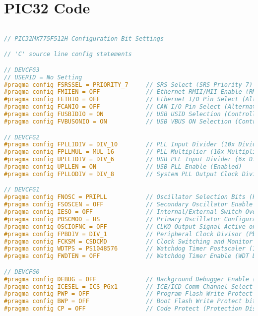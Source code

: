 \chapter{PIC32 Code}\label{appendix:pic32_code}

\begin{lstlisting}[language=C]

// PIC32MX775F512H Configuration Bit Settings

// 'C' source line config statements

// DEVCFG3
// USERID = No Setting
#pragma config FSRSSEL = PRIORITY_7     // SRS Select (SRS Priority 7)
#pragma config FMIIEN = OFF             // Ethernet RMII/MII Enable (RMII Enabled)
#pragma config FETHIO = OFF             // Ethernet I/O Pin Select (Alternate Ethernet I/O)
#pragma config FCANIO = OFF             // CAN I/O Pin Select (Alternate CAN I/O)
#pragma config FUSBIDIO = ON            // USB USID Selection (Controlled by the USB Module)
#pragma config FVBUSONIO = ON           // USB VBUS ON Selection (Controlled by USB Module)

// DEVCFG2
#pragma config FPLLIDIV = DIV_10        // PLL Input Divider (10x Divider)
#pragma config FPLLMUL = MUL_16         // PLL Multiplier (16x Multiplier)
#pragma config UPLLIDIV = DIV_6         // USB PLL Input Divider (6x Divider)
#pragma config UPLLEN = ON              // USB PLL Enable (Enabled)
#pragma config FPLLODIV = DIV_8         // System PLL Output Clock Divider (PLL Divide by 8)

// DEVCFG1
#pragma config FNOSC = PRIPLL           // Oscillator Selection Bits (Primary Osc w/PLL (XT+,HS+,EC+PLL))
#pragma config FSOSCEN = OFF            // Secondary Oscillator Enable (Disabled)
#pragma config IESO = OFF               // Internal/External Switch Over (Disabled)
#pragma config POSCMOD = HS             // Primary Oscillator Configuration (HS osc mode)
#pragma config OSCIOFNC = OFF           // CLKO Output Signal Active on the OSCO Pin (Disabled)
#pragma config FPBDIV = DIV_1           // Peripheral Clock Divisor (Pb_Clk is Sys_Clk/1)
#pragma config FCKSM = CSDCMD           // Clock Switching and Monitor Selection (Clock Switch Disable, FSCM Disabled)
#pragma config WDTPS = PS1048576        // Watchdog Timer Postscaler (1:1048576)
#pragma config FWDTEN = OFF             // Watchdog Timer Enable (WDT Disabled (SWDTEN Bit Controls))

// DEVCFG0
#pragma config DEBUG = OFF              // Background Debugger Enable (Debugger is disabled)
#pragma config ICESEL = ICS_PGx1        // ICE/ICD Comm Channel Select (ICE EMUC1/EMUD1 pins shared with PGC1/PGD1)
#pragma config PWP = OFF                // Program Flash Write Protect (Disable)
#pragma config BWP = OFF                // Boot Flash Write Protect bit (Protection Disabled)
#pragma config CP = OFF                 // Code Protect (Protection Disabled)


\end{lstlisting}
